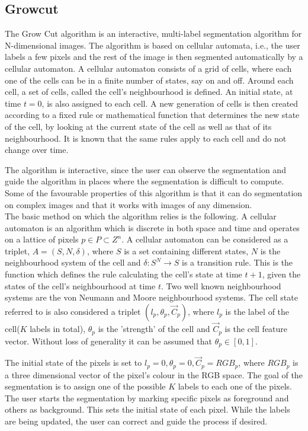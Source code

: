 \documentclass[a4paper,10pt]{article}
\begin{document}
\subsection{Growcut}
\label{growcut}
The Grow Cut algorithm is an interactive, multi-label segmentation algorithm for
N-dimensional images.  The algorithm is based on cellular automata, i.e.,  the
user labels a few pixels
and the rest of the image is then segmented automatically by a cellular
automaton.  A cellular automaton consists of a grid of cells, where each one of
the cells can be in 
a finite number of states, say on and off.   Around each cell, a set of cells,
called the cell's neighbourhood is defined.  An initial state, at time $t = 0$,
is also assigned to each cell.
A new generation of cells is then created according to a fixed rule or
mathematical function that determines the new state of the cell, by looking at
the current state of the cell as well
as that of its neighbourhood.  It is known that the same rules apply to each
cell and do not change over time.

The algorithm is interactive, since the user can observe the segmentation and
guide the algorithm in places where the segmentation is difficult to compute.
Some of the favourable properties of this algorithm is that it can do
segmentation on complex images and that it works with images of any dimension.
\\


\noindent The basic method on which the algorithm relies is the following.  A
cellular automaton is an algorithm which is discrete in both space and time and
operates on a 
lattice of pixels $p \in P \subset Z^{n}$.  A cellular automaton can be
considered as a triplet, $A = (S, N, \delta)$, where $S$ is a set containing
different states, $N$ is the
neighbourhood system of the cell and $\delta: S^{N} \rightarrow S $ is a
transition rule.  This is the function which defines  the rule calculating the
cell's state at time $t + 1$, given the states 
of the cell's neighbourhood at time $t$.  Two well known neighbourhood systems
are the von Neumann and Moore neighbourhood systems.  The cell state referred to
is also
considered a triplet $(l_{p}, \theta_{p}, \overrightarrow{C}_{p})$, where
$l_{p}$ is the label of the cell($K$ labels in total), $\theta_{p}$ is the
'strength' of the cell and $\overrightarrow{C}_{p}$ is
the cell feature vector.  Without loss of generality it can be assumed that
$\theta_{p} \in [0,1]$. 

The initial state of the pixels is set to $l_{p} = 0, \theta_{p} = 0,
\overrightarrow{C}_{p} = RGB_{p}$, where $RGB_{p}$ is a three dimensional vector
of the pixel's colour in 
the RGB space.  The goal of the segmentation is to assign one of the possible
$K$ labels to each one of the pixels.  The user starts the segmentation by
marking specific pixels as
foreground and others as background.  This sets the initial state of each pixel.
 While the labels are being updated, the user can correct and guide the process
if desired.  \\
\end{document}
